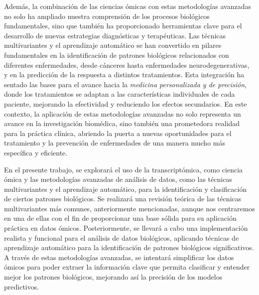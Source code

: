 Además, la combinación de las ciencias ómicas con estas metodologías avanzadas no solo ha ampliado nuestra comprensión
de los procesos biológicos fundamentales, sino que también ha proporcionado herramientas clave para el desarrollo de 
nuevas estrategias diagnósticas y terapéuticas. Las técnicas multivariantes y el aprendizaje 
automático se han convertido en pilares fundamentales en la identificación de patrones biológicos relacionados 
con diferentes enfermedades, desde cánceres hasta enfermedades neurodegenerativas, y en la predicción de la 
respuesta a distintos tratamientos. Esta integración ha sentado las bases para el avance hacia la 
\textit{medicina personalizada y de precisión}, donde los tratamientos se adaptan a las características 
individuales de cada paciente, mejorando la efectividad y reduciendo los efectos secundarios. En este contexto, 
la aplicación de estas metodologías avanzadas no solo representa un avance en la investigación biomédica, sino 
también una prometedora realidad para la práctica clínica, abriendo la puerta a nuevas oportunidades para el 
tratamiento y la prevención de enfermedades de una manera mucho más específica y eficiente. \newline

En el presente trabajo, se explorará el uso de la transcriptómica, como ciencia ómica y las metodologías avanzadas de análisis de 
datos, como las técnicas multivariantes y el aprendizaje automático, para la identificación y clasificación 
de ciertos patrones biológicos. Se realizará una revisión teórica de las técnicas multivariantes más comunes, 
anteriormente mencionadas, aunque nos centraremos en una de ellas con el fin de proporcionar una base sólida 
para su aplicación práctica en datos ómicos. Posteriormente, se llevará a cabo una implementación realista y 
funcional para el análisis de datos biológicos, aplicando técnicas de aprendizaje automático para la identificación 
de patrones biológicos significativos. A través de estas metodologías avanzadas, se intentará simplificar los datos 
ómicos para poder extraer la información clave que permita clasificar y entender mejor los patrones biológicos, 
mejorando así la precisión de los modelos predictivos.

